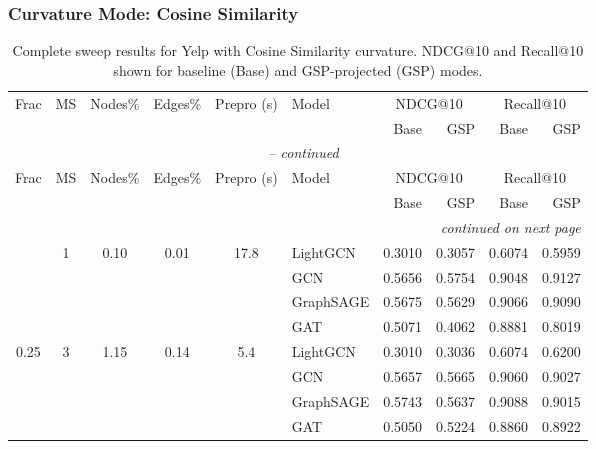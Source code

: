 \subsubsection*{Curvature Mode: Cosine Similarity}
{\footnotesize
\setlength{\tabcolsep}{4pt}
\begin{longtable}{cccccl rrrr}
\caption{Complete sweep results for Yelp with Cosine Similarity curvature. NDCG@10 and Recall@10 shown for baseline (Base) and GSP-projected (GSP) modes.} \label{tab:yelp_cosine_sweep} \\
\toprule
\multirow{2}{*}{Frac} & \multirow{2}{*}{MS} & \multirow{2}{*}{Nodes\%} & \multirow{2}{*}{Edges\%} & \multirow{2}{*}{Prepro (s)} & \multirow{2}{*}{Model} & \multicolumn{2}{c}{NDCG@10} & \multicolumn{2}{c}{Recall@10} \\
\cmidrule(lr){7-8}\cmidrule(lr){9-10}
 & & & & & & Base & GSP & Base & GSP \\
\midrule
\endfirsthead
\multicolumn{10}{c}{\tablename~\thetable{} -- \textit{continued}} \\
\toprule
\multirow{2}{*}{Frac} & \multirow{2}{*}{MS} & \multirow{2}{*}{Nodes\%} & \multirow{2}{*}{Edges\%} & \multirow{2}{*}{Prepro (s)} & \multirow{2}{*}{Model} & \multicolumn{2}{c}{NDCG@10} & \multicolumn{2}{c}{Recall@10} \\
\cmidrule(lr){7-8}\cmidrule(lr){9-10}
 & & & & & & Base & GSP & Base & GSP \\
\midrule
\endhead
\midrule \multicolumn{10}{r}{\textit{continued on next page}} \\
\endfoot
\bottomrule
\endlastfoot
\multirow{4}{*}{0.25} & \multirow{4}{*}{1} & \multirow{4}{*}{0.10} & \multirow{4}{*}{0.01} & \multirow{4}{*}{17.8} & LightGCN & 0.3010 & 0.3057 & 0.6074 & 0.5959 \\
 & & & & & GCN & 0.5656 & 0.5754 & 0.9048 & 0.9127 \\
 & & & & & GraphSAGE & 0.5675 & 0.5629 & 0.9066 & 0.9090 \\
 & & & & & GAT & 0.5071 & 0.4062 & 0.8881 & 0.8019 \\
\midrule
\multirow{4}{*}{0.25} & \multirow{4}{*}{3} & \multirow{4}{*}{1.15} & \multirow{4}{*}{0.14} & \multirow{4}{*}{5.4} & LightGCN & 0.3010 & 0.3036 & 0.6074 & 0.6200 \\
 & & & & & GCN & 0.5657 & 0.5665 & 0.9060 & 0.9027 \\
 & & & & & GraphSAGE & 0.5743 & 0.5637 & 0.9088 & 0.9015 \\
 & & & & & GAT & 0.5050 & 0.5224 & 0.8860 & 0.8922 \\

\end{longtable}}
